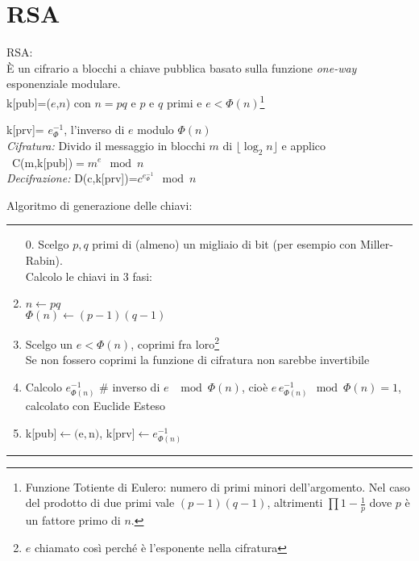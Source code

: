 \documentclass{article}
\begin{document}
\section{RSA}
RSA:\\
\`E un cifrario a blocchi a chiave pubblica basato sulla funzione \textit{one-way} esponenziale modulare.\\
\indent\indent k[pub]=($e$,$n$) con $n=pq$ e $p$ e $q$ primi e $e<\Phi(n)$\footnote{Funzione Totiente di Eulero: numero di primi minori dell'argomento. Nel caso del prodotto di due primi vale $(p-1)(q-1)$, altrimenti $\prod 1-\frac{1}{p}$ dove $p$ è un fattore primo di $n$.} 

\indent\indent k[prv]= $e^{-1}_\Phi$, l'inverso di $e$ modulo $\Phi(n)$\\
\textit{Cifratura:} Divido il messaggio in blocchi $m$ di $\lfloor \log_2 n\rfloor$ e applico\\
\indent\indent\indent\indent\, C(m,k[pub])$=m^e\mod n$\\
\textit{Decifrazione:} D(c,k[prv])=$c^{e^{-1}_\Phi}\mod n$

Algoritmo di generazione delle chiavi:
\hrule
\begin{enumerate}
    \item[0.] Scelgo $p,q$ primi di (almeno) un migliaio di bit (per esempio con Miller-Rabin).\\ Calcolo le chiavi in 3 fasi: \\
    \item $n\leftarrow pq$\\
    \indent\indent $\Phi(n)\leftarrow (p-1)(q-1)$
    \item Scelgo un $e<\Phi(n)$, coprimi fra loro\footnote{$e$ chiamato così perché è l'esponente nella cifratura}\\ Se non fossero coprimi la funzione di cifratura non sarebbe invertibile
    \item Calcolo $e^{-1}_{\Phi(n)}$ \# inverso di $e$ $\mod \Phi(n)$, cioè $e\,e^{-1}_{\Phi(n)} \mod \Phi(n)=1$, calcolato con Euclide Esteso
    \item k[pub]$\leftarrow ($e$,$n$)$, k[prv]$\leftarrow e^{-1}_{\Phi(n)}$
\end{enumerate}
\hrule
\end{document}
